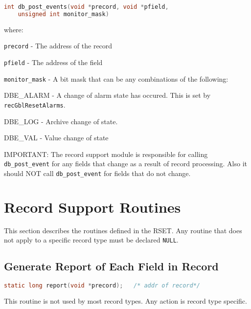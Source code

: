 \begin{lstlisting}[language=C]
int db_post_events(void *precord, void *pfield,
    unsigned int monitor_mask)
\end{lstlisting}
where:
\begin{description}
\item \verb|precord| - The address of the record

\item \verb|pfield| - The address of the field

\item \verb|monitor_mask| - A bit mask that can be any combinations of the following:


\begin{description}

\item {}DBE\_ALARM - A change of alarm state has occured.
This is set by \verb|recGblResetAlarms|.

\item {}DBE\_LOG - Archive change of state.

\item {}DBE\_VAL - Value change of state

\end{description}

\end{description}
IMPORTANT:
The record support module is responsible for calling \verb|db_post_event| for any fields that change as a result of record processing.
Also it should NOT call \verb|db_post_event| for fields that do not change.

\section{Record Support Routines}

This section describes the routines defined in the RSET.
Any routine that does not apply to a specific record type must be declared \verb|NULL|.

\subsection{Generate Report of Each Field in Record}

\begin{lstlisting}[language=C]
static long report(void *precord);   /* addr of record*/
\end{lstlisting}

This routine is not used by most record types.
Any action is record type specific.

